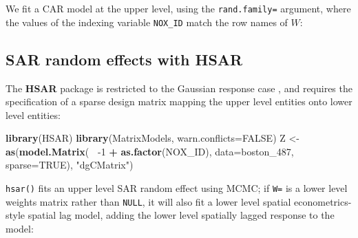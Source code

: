 \documentclass[]{book}
\newenvironment{Shaded}{\begin{snugshade}}{\end{snugshade}}
\newcommand{\DataTypeTok}[1]{\textcolor[rgb]{0.13,0.29,0.53}{#1}}
\newcommand{\DecValTok}[1]{\textcolor[rgb]{0.00,0.00,0.81}{#1}}
\newcommand{\KeywordTok}[1]{\textcolor[rgb]{0.13,0.29,0.53}{\textbf{#1}}}
\newcommand{\NormalTok}[1]{#1}
\newcommand{\OperatorTok}[1]{\textcolor[rgb]{0.81,0.36,0.00}{\textbf{#1}}}
\newcommand{\OtherTok}[1]{\textcolor[rgb]{0.56,0.35,0.01}{#1}}
\newcommand{\StringTok}[1]{\textcolor[rgb]{0.31,0.60,0.02}{#1}}
\begin{document}
We fit a CAR model at the upper level, using the \texttt{rand.family=} argument, where the values of the indexing variable \texttt{NOX\_ID} match the row names of \(W\):

\begin{Shaded}
\end{Shaded}

\hypertarget{sar-random-effects-with-hsar}{%
\subsection{SAR random effects with HSAR}\label{sar-random-effects-with-hsar}}

The \textbf{HSAR} package \citep{R-HSAR} is restricted to the Gaussian response case \citep{dong15, dongetal15}, and requires the specification of a sparse design matrix mapping the upper level entities onto lower level entities:

\begin{Shaded}
\begin{Highlighting}[]
\KeywordTok{library}\NormalTok{(HSAR)}
\KeywordTok{library}\NormalTok{(MatrixModels, }\DataTypeTok{warn.conflicts=}\OtherTok{FALSE}\NormalTok{)}
\NormalTok{Z <-}\StringTok{ }\KeywordTok{as}\NormalTok{(}\KeywordTok{model.Matrix}\NormalTok{(}\OperatorTok{~}\StringTok{ }\DecValTok{-1} \OperatorTok{+}\StringTok{ }\KeywordTok{as.factor}\NormalTok{(NOX_ID), }\DataTypeTok{data=}\NormalTok{boston_}\DecValTok{487}\NormalTok{, }\DataTypeTok{sparse=}\OtherTok{TRUE}\NormalTok{),}
    \StringTok{"dgCMatrix"}\NormalTok{)}
\end{Highlighting}
\end{Shaded}

\texttt{hsar()} fits an upper level SAR random effect using MCMC; if \texttt{W=} is a lower level weights matrix rather than \texttt{NULL}, it will also fit a lower level spatial econometrics-style spatial lag model, adding the lower level spatially lagged response to the model:
\end{document}
